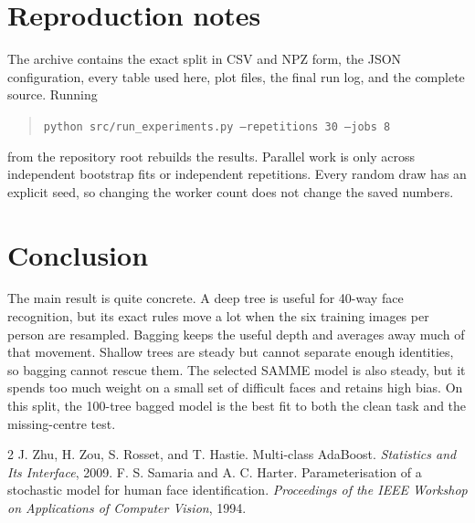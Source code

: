 \documentclass[10pt,twocolumn,letterpaper]{article}
\begin{document}
\balance
\section{Reproduction notes}
The archive contains the exact split in CSV and NPZ form, the JSON configuration, every table used here, plot files, the final run log, and the complete source. Running
\begin{quote}\small
\texttt{python src/run\_experiments.py --repetitions 30 --jobs 8}
\end{quote}
from the repository root rebuilds the results. Parallel work is only across independent bootstrap fits or independent repetitions. Every random draw has an explicit seed, so changing the worker count does not change the saved numbers.

\section{Conclusion}
The main result is quite concrete. A deep tree is useful for 40-way face recognition, but its exact rules move a lot when the six training images per person are resampled. Bagging keeps the useful depth and averages away much of that movement. Shallow trees are steady but cannot separate enough identities, so bagging cannot rescue them. The selected SAMME model is also steady, but it spends too much weight on a small set of difficult faces and retains high bias. On this split, the 100-tree bagged model is the best fit to both the clean task and the missing-centre test.

{\small
\begin{thebibliography}{2}
 J. Zhu, H. Zou, S. Rosset, and T. Hastie. Multi-class AdaBoost. \textit{Statistics and Its Interface}, 2009.
 F. S. Samaria and A. C. Harter. Parameterisation of a stochastic model for human face identification. \textit{Proceedings of the IEEE Workshop on Applications of Computer Vision}, 1994.
\end{thebibliography}}
\end{document}
